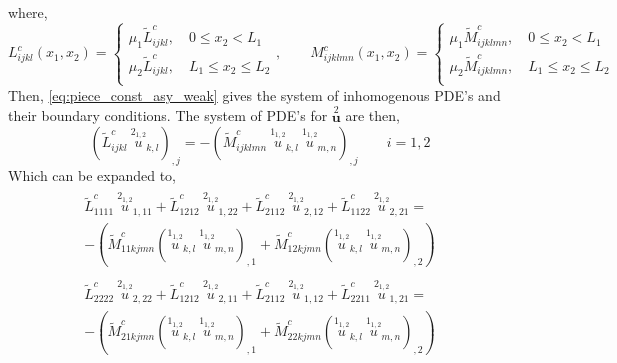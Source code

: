 \documentclass[11pt]{report}
\begin{document}
\begin{appendices}
\begin{equation}
\begin{split}
\end{split}
\end{equation}
where,
\begin{equation}
L^c_{ijkl}(x_1, x_2) =
\left \{
\begin{aligned}
  \mu_1 \tilde{L}^c_{ijkl}, \quad  0 \leq x_2 < L_1 \\
  \mu_2 \tilde{L}^c_{ijkl}, \quad  L_1 \leq x_2 \leq L_2\\
\end{aligned}
\right. , \qquad M^c_{ijklmn}(x_1, x_2) =
\left \{
\begin{aligned}
  \mu_1 \tilde{M}^c_{ijklmn}, \quad  0 \leq x_2 < L_1 \\
  \mu_2 \tilde{M}^c_{ijklmn}, \quad  L_1 \leq x_2 \leq L_2 \\
\end{aligned}
\right.
\end{equation}
Then, \eqref{eq:piece_const_asy_weak} gives the system of inhomogenous PDE's and their boundary conditions. The system of PDE's for $\overset{2}{\mathbf{u}}$ are then,
\begin{equation}
\left( \tilde{L}^c_{ijkl} \: \overset{2_{1,2}}{u}_{k,l} \right)_{,j} = -\left( \tilde{M}^c_{ijklmn} \: \overset{1_{1,2}}{u}_{k,l} \: \overset{1_{1,2}}{u}_{m,n} \right)_{,j} \qquad i = 1,2
\end{equation} 
Which can be expanded to,
\begin{align}
\begin{gathered}
\tilde{L}^{c}_{1111} \: \overset{2_{1,2}}{u}_{1,11} + \tilde{L}^{c}_{1212} \: \overset{2_{1,2}}{u}_{1,22}+ \tilde{L}^{c}_{2112} \: \overset{2_{1,2}}{u}_{2,12}  + \tilde{L}^{c}_{1122} \: \overset{2_{1,2}}{u}_{2,21} = \\
-\left(\tilde{M}^c_{11kjmn}(\overset{1_{1,2}}{u}_{k,l} \: \overset{1_{1,2}}{u}_{m,n})_{,1} + \tilde{M}^c_{12kjmn}(\overset{1_{1,2}}{u}_{k,l} \: \overset{1_{1,2}}{u}_{m,n})_{,2}  \right) \label{eq:piece_const_pde_expand_1}
\end{gathered}
\\
\begin{gathered}
\tilde{L}^{c}_{2222} \: \overset{2_{1,2}}{u}_{2,22}+ \tilde{L}^{c}_{1212} \: \overset{2_{1,2}}{u}_{2,11}+ \tilde{L}^{c}_{2112} \: \overset{2_{1,2}}{u}_{1,12}  + \tilde{L}^{c}_{2211} \: \overset{2_{1,2}}{u}_{1,21} = \\
-\left(\tilde{M}^c_{21kjmn}(\overset{1_{1,2}}{u}_{k,l} \: \overset{1_{1,2}}{u}_{m,n})_{,1} + \tilde{M}^c_{22kjmn}(\overset{1_{1,2}}{u}_{k,l} \: \overset{1_{1,2}}{u}_{m,n})_{,2} \right) \label{eq:piece_const_pde_expand_2}

\end{gathered}
\end{align}
\end{appendices}
\end{document}
